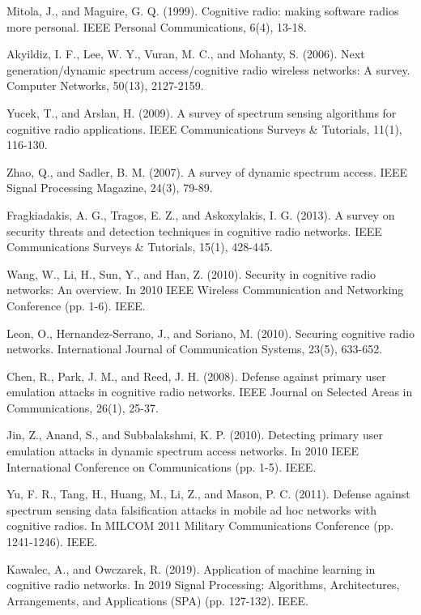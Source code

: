 \begin{thebibliography}{99}
 Mitola, J., and Maguire, G. Q. (1999). Cognitive radio: making software radios more personal. IEEE Personal Communications, 6(4), 13-18.

 Akyildiz, I. F., Lee, W. Y., Vuran, M. C., and Mohanty, S. (2006). Next generation/dynamic spectrum access/cognitive radio wireless networks: A survey. Computer Networks, 50(13), 2127-2159.

 Yucek, T., and Arslan, H. (2009). A survey of spectrum sensing algorithms for cognitive radio applications. IEEE Communications Surveys \& Tutorials, 11(1), 116-130.

 Zhao, Q., and Sadler, B. M. (2007). A survey of dynamic spectrum access. IEEE Signal Processing Magazine, 24(3), 79-89.

 Fragkiadakis, A. G., Tragos, E. Z., and Askoxylakis, I. G. (2013). A survey on security threats and detection techniques in cognitive radio networks. IEEE Communications Surveys \& Tutorials, 15(1), 428-445.

 Wang, W., Li, H., Sun, Y., and Han, Z. (2010). Security in cognitive radio networks: An overview. In 2010 IEEE Wireless Communication and Networking Conference (pp. 1-6). IEEE.

 Leon, O., Hernandez-Serrano, J., and Soriano, M. (2010). Securing cognitive radio networks. International Journal of Communication Systems, 23(5), 633-652.

 Chen, R., Park, J. M., and Reed, J. H. (2008). Defense against primary user emulation attacks in cognitive radio networks. IEEE Journal on Selected Areas in Communications, 26(1), 25-37.

 Jin, Z., Anand, S., and Subbalakshmi, K. P. (2010). Detecting primary user emulation attacks in dynamic spectrum access networks. In 2010 IEEE International Conference on Communications (pp. 1-5). IEEE.

 Yu, F. R., Tang, H., Huang, M., Li, Z., and Mason, P. C. (2011). Defense against spectrum sensing data falsification attacks in mobile ad hoc networks with cognitive radios. In MILCOM 2011 Military Communications Conference (pp. 1241-1246). IEEE.

 Kawalec, A., and Owczarek, R. (2019). Application of machine learning in cognitive radio networks. In 2019 Signal Processing: Algorithms, Architectures, Arrangements, and Applications (SPA) (pp. 127-132). IEEE.


\end{thebibliography}
